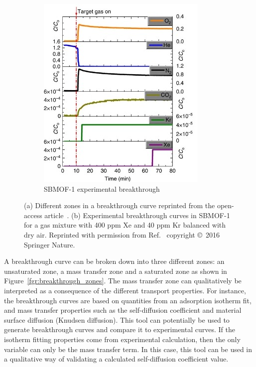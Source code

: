 \documentclass[main]{subfiles}
\begin{document}
\begin{figure}[ht]
\begin{subfigure}[b]{0.4\textwidth}
    \includegraphics[width=\textwidth]{figures/6-perspectives/sbmof_breakthrough.jpg}
    \caption{SBMOF-1 experimental breakthrough}\label{fgr:sbmof_breakthrough}
  \end{subfigure}
  \caption{ (a) Different zones in a breakthrough curve reprinted from the open-access article~\cite{Sharma_2023}. (b) Experimental breakthrough curves in SBMOF-1 for a gas mixture with 400 ppm Xe and 40 ppm Kr balanced with dry air. Reprinted with permission from Ref.~\cite{Banerjee_2016} copyright \copyright\ 2016 Springer Nature. }\label{fgr:breakthrough}
\end{figure}

A breakthrough curve can be broken down into three different zones: an unsaturated zone, a mass transfer zone and a saturated zone as shown in Figure~\ref{fgr:breakthrough_zones}. The mass transfer zone can qualitatively be interpreted as a consequence of the different transport properties. For instance, the breakthrough curves are based on quantities from an adsorption isotherm fit, and mass transfer properties such as the self-diffusion coefficient and material surface diffusion (Knudsen diffusion).\autocite{Sharma_2023} This tool can potentially be used to generate breakthrough curves and compare it to experimental curves. If the isotherm fitting properties come from experimental calculation, then the only variable can only be the mass transfer term. In this case, this tool can be used in a qualitative way of validating a calculated self-diffusion coefficient value.
\end{document}
